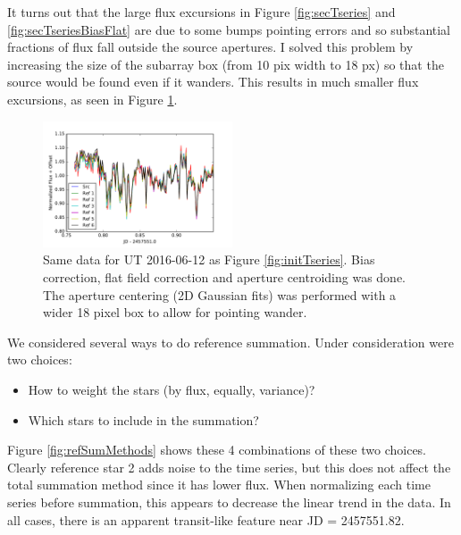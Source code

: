 \documentclass[twocolumn]{aastex61}
\begin{document}
It turns out that the large flux excursions in Figure \ref{fig:secTseries} and \ref{fig:secTseriesBiasFlat} are due to some bumps pointing errors and so substantial fractions of flux fall outside the source apertures.
I solved this problem by increasing the size of the subarray box (from 10 pix width to 18 px) so that the source would be found even if it wanders.
This results in much smaller flux excursions, as seen in Figure \ref{fig:secTseriesWiderBox}.

\begin{figure}
\begin{centering}
\includegraphics[width=0.5\textwidth]{second_t_series_wider_box.pdf}
\caption{Same data for UT 2016-06-12 as Figure \ref{fig:initTseries}.
Bias correction, flat field correction and aperture centroiding was done.
The aperture centering (2D Gaussian fits) was performed with a wider 18 pixel box to allow for pointing wander.}\label{fig:secTseriesWiderBox}
\end{centering}
\end{figure}

We considered several ways to do reference summation.
Under consideration were two choices:
\begin{itemize}
	\item How to weight the stars (by flux, equally, variance)?
	\item Which stars to include in the summation?
\end{itemize}
Figure \ref{fig:refSumMethods} shows these 4 combinations of these two choices.
Clearly reference star 2 adds noise to the time series, but this does not affect the total summation method since it has lower flux.
When normalizing each time series before summation, this appears to decrease the linear trend in the data.
In all cases, there is an apparent transit-like feature near JD = 2457551.82.
\end{document}

